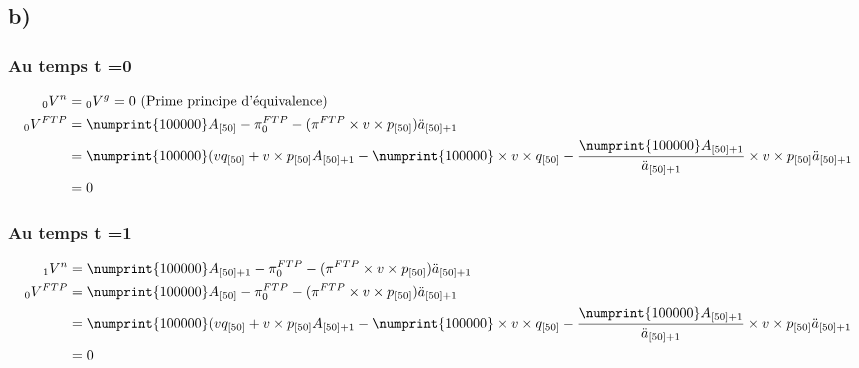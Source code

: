 \documentclass[11pt,french]{report}
\newcommand{\indiceGauche}[2]{{\vphantom{#2}}_{#1}#2}
\begin{document}
\subsection*{b)}
\subsubsection*{Au temps t =0}
\begin{align*}
\indiceGauche{0}{V}^n &= \indiceGauche{0}{V}^g =0 \text{ (Prime principe d'équivalence)}\\
\indiceGauche{0}{V}^{FTP} &= \numprint{100000}A_{[50]} - \pi_0^{FTP} - (\pi^{FTP} \times v \times p_{[50]})\ddot{a}_{[50] +1} \\
&=\numprint{100000}(v q_{[50]} + v \times p_{[50]}A_{[50]+1} - \numprint{100000}\times v \times q_{[50]} - \frac{\numprint{100000}A_{[50] +1} }{\ddot{a}_{[50] +1} } \times v \times p_{[50]}\ddot{a}_{[50] +1}  \\
&= 0
\end{align*} 
\subsubsection*{Au temps t =1}
\begin{align*}
\indiceGauche{1}{V}^n &= \numprint{100000}A_{[50]+1} - \pi_0^{FTP} - (\pi^{FTP} \times v \times p_{[50]})\ddot{a}_{[50] +1} \\
\indiceGauche{0}{V}^{FTP} &= \numprint{100000}A_{[50]} - \pi_0^{FTP} - (\pi^{FTP} \times v \times p_{[50]})\ddot{a}_{[50] +1} \\
&=\numprint{100000}(v q_{[50]} + v \times p_{[50]}A_{[50]+1} - \numprint{100000}\times v \times q_{[50]} - \frac{\numprint{100000}A_{[50] +1} }{\ddot{a}_{[50] +1} } \times v \times p_{[50]}\ddot{a}_{[50] +1}  \\
&= 0
\end{align*} 
\end{document}
